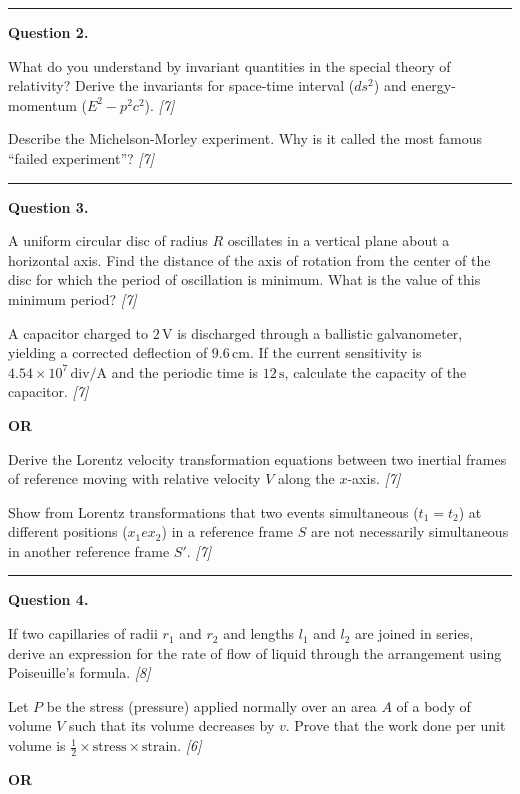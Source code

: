 \documentclass[11pt,a4paper]{article}
\newcommand{\pts}[1]{\hfill   \textit{[#1]}}
\begin{document}
\medskip\rule{\linewidth}{0.2pt}




\noindent   \textbf{Question 2.}

\begin{parts}
  \item What do you understand by invariant quantities in the special theory of relativity? Derive the invariants for space-time interval ($ds^2$) and energy-momentum ($E^2 - p^2c^2$). \pts{7}
  \item Describe the Michelson-Morley experiment. Why is it called the most famous ``failed experiment''? \pts{7}
\end{parts}

\medskip\rule{\linewidth}{0.2pt}




\noindent   \textbf{Question 3.}

\begin{parts}
  \item A uniform circular disc of radius $R$ oscillates in a vertical plane about a horizontal axis. Find the distance of the axis of rotation from the center of the disc for which the period of oscillation is minimum. What is the value of this minimum period? \pts{7}
  \item A capacitor charged to $2\, \text{V}$ is discharged through a ballistic galvanometer, yielding a corrected deflection of $9.6\, \text{cm}$. If the current sensitivity is $4.54  \times 10^7\, \text{div/A}$ and the periodic time is $12\, \text{s}$, calculate the capacity of the capacitor. \pts{7}
\end{parts}
\hfill   \textbf{OR}

\begin{parts}
  \item Derive the Lorentz velocity transformation equations between two inertial frames of reference moving with relative velocity $V$ along the $x$-axis. \pts{7}
  \item Show from Lorentz transformations that two events simultaneous ($t_1 = t_2$) at different positions ($x_1 
e x_2$) in a reference frame $S$ are not necessarily simultaneous in another reference frame $S'$. \pts{7}
\end{parts}

\medskip\rule{\linewidth}{0.2pt}




\noindent   \textbf{Question 4.}

\begin{parts}
  \item If two capillaries of radii $r_1$ and $r_2$ and lengths $l_1$ and $l_2$ are joined in series, derive an expression for the rate of flow of liquid through the arrangement using Poiseuille's formula. \pts{8}
  \item Let $P$ be the stress (pressure) applied normally over an area $A$ of a body of volume $V$ such that its volume decreases by $v$. Prove that the work done per unit volume is $\frac{1}{2}  \times  \text{stress}  \times  \text{strain}$. \pts{6}
\end{parts}
\hfill   \textbf{OR}
\end{document}
